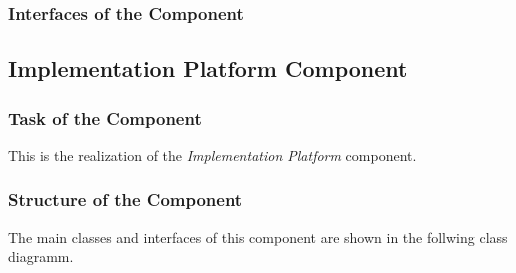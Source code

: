 \documentclass[11pt,a4paper]{article}
\begin{document}
\subsubsection{Interfaces of the Component}

\subsection{Implementation Platform Component}
\label{sec:impl-platf-comp}

\subsubsection{Task of the Component}

This is the realization of the \emph{Implementation Platform}
component.

\subsubsection{Structure of the Component}

The main classes and interfaces of this component are shown in the follwing
class diagramm.

\begin{center}
\end{center}
\end{document}
